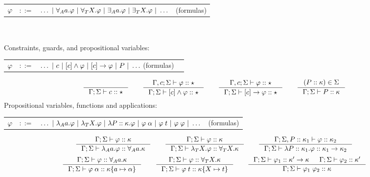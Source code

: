 \documentclass[english, mgr]{iithesis}
\begin{document}
\begin{tabular}{rrlr}
$\varphi$ & $::=$ & $\ldots
               \ |\  \forall_A a . \varphi
               \ |\  \forall_T X . \varphi
               \ |\  \exists_A a . \varphi
               \ |\  \exists_T X . \varphi
               \ |\  \ldots$
    & (formulas)
\end{tabular}
\\ \\
Constraints, guards, and propositional variables:

\begin{tabular}{rrlr}
$\varphi$ & $::=$ & $\ldots
               \ |\  c
               \ |\  [c]\wedge \varphi
               \ |\  [c]\to \varphi
               \ |\  P
               \ |\  \ldots$  (formulas)
\end{tabular}
$$
\inference{
}{
  \cEnv; \kEnv \vdash \fConstr{\constr} \ofkind \kProp
}
\qquad
\inference{
  \cEnv,\constr; \kEnv \vdash \formphi \ofkind \kProp
}{
  \cEnv; \kEnv \vdash \fCAnd{\constr} \formphi \ofkind \kProp
}
\qquad
\inference{
  \cEnv,\constr; \kEnv \vdash \formphi \ofkind \kProp
}{
  \cEnv; \kEnv \vdash \fCImp{\constr} \formphi \ofkind \kProp
}
\qquad
\inference{
  (\propv \ofkind \kind) \in \kEnv
}{
  \cEnv; \kEnv \vdash  \propv \ofkind \kind
}
$$
Propositional variables, functions and applications:

\begin{tabular}{rrlr}
$\varphi$ & $::=$ & $\ldots
               \ |\  \lambda_A a . \varphi
               \ |\  \lambda_T X . \varphi
               \ |\  \lambda P :: \kappa. \varphi
               \ |\  \varphi \;\alpha
               \ |\  \varphi \;t
               \ |\  \varphi \; \varphi
               \ |\  \ldots$
    & (formulas)
\end{tabular}
$$
\inference{
  \cEnv; \kEnv \vdash \formphi \ofkind \kind
}{
  \cEnv; \kEnv \vdash \fLamAtom{\atomv} \formphi \ofkind \kForallAtom{\atomv}\kind
}
\qquad
\inference{
  \cEnv; \kEnv \vdash \formphi \ofkind \kind
}{
  \cEnv; \kEnv \vdash \fLamTerm{\termv} \formphi \ofkind \kForallTerm{\termv}\kind
}
\qquad
\inference{
  \cEnv; \kEnv, \propv \ofkind \kind_1 \vdash \formphi \ofkind \kind_2
}{
  \cEnv; \kEnv \vdash \fLamForm{\propv}{\kind_1} \formphi \ofkind \kind_1 \karrow \kind_2
}
$$
$$
\inference{
  \cEnv;\kEnv\vdash \formphi \ofkind \kForallAtom{\atomv}\kind
}{
  \cEnv;\kEnv\vdash \formphi \fAppAtom{\atomexp} \ofkind \kind \subst{\atomv}{\atomexp}
}
\qquad
\inference{
  \cEnv;\kEnv\vdash \formphi \ofkind \kForallTerm{\termv}\kind
}{
  \cEnv;\kEnv\vdash \formphi \fAppTerm{\term} \ofkind \kind\subst{\termv}{\term}
}
\qquad
\inference{
  \cEnv; \kEnv \vdash \formphi_1 \ofkind \kind' \karrow \kind &
  \cEnv; \kEnv \vdash \formphi_2 \ofkind \kind'
}{
  \cEnv;\kEnv\vdash \formphi_1 \fApp \formphi_2 \ofkind \kind
}
$$
\end{document}

